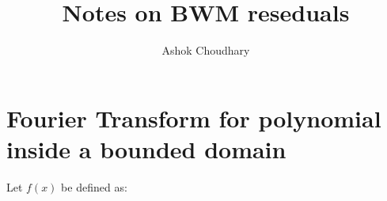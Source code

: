 \documentclass[prd,preprintnumbers,twocolumn,eqsecnum,floatfix,letter]{revtex4}
\begin{document}
\newcommand{\be}{\begin{equation}}
\newcommand{\ee}{\end{equation}}
\newcommand{\ber}{\begin{eqnarray}}
\newcommand{\eer}{\end{eqnarray}}
\def\bea{\begin{eqnarray}}
\def\eea{\end{eqnarray}}
\newcommand{\etal}{\emph{et al.}}



\title{Notes on BWM reseduals }
\author{Ashok Choudhary}

\begin{abstract}
\end{abstract}

\maketitle

\section{Fourier Transform for polynomial inside a bounded domain}
Let $f(x)$ be defined as:
\end{document}
